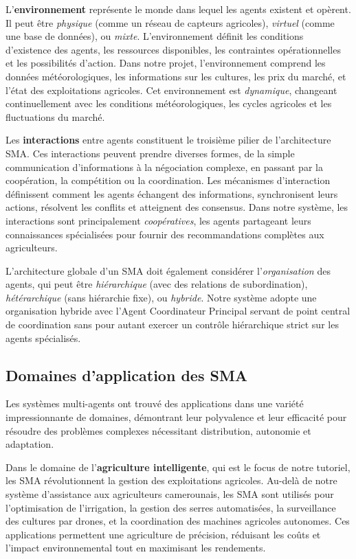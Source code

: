 L'\textbf{environnement} représente le monde dans lequel les agents existent et opèrent. Il peut être \emph{physique} (comme un réseau de capteurs agricoles), \emph{virtuel} (comme une base de données), ou \emph{mixte}. L'environnement définit les conditions d'existence des agents, les ressources disponibles, les contraintes opérationnelles et les possibilités d'action. Dans notre projet, l'environnement comprend les données météorologiques, les informations sur les cultures, les prix du marché, et l'état des exploitations agricoles. Cet environnement est \emph{dynamique}, changeant continuellement avec les conditions météorologiques, les cycles agricoles et les fluctuations du marché.

Les \textbf{interactions} entre agents constituent le troisième pilier de l'architecture SMA. Ces interactions peuvent prendre diverses formes, de la simple communication d'informations à la négociation complexe, en passant par la coopération, la compétition ou la coordination. Les mécanismes d'interaction définissent comment les agents échangent des informations, synchronisent leurs actions, résolvent les conflits et atteignent des consensus. Dans notre système, les interactions sont principalement \emph{coopératives}, les agents partageant leurs connaissances spécialisées pour fournir des recommandations complètes aux agriculteurs.

L'architecture globale d'un SMA doit également considérer l'\emph{organisation} des agents, qui peut être \emph{hiérarchique} (avec des relations de subordination), \emph{hétérarchique} (sans hiérarchie fixe), ou \emph{hybride}. Notre système adopte une organisation hybride avec l'Agent Coordinateur Principal servant de point central de coordination sans pour autant exercer un contrôle hiérarchique strict sur les agents spécialisés.

\subsection{Domaines d'application des SMA}

Les systèmes multi-agents ont trouvé des applications dans une variété impressionnante de domaines, démontrant leur polyvalence et leur efficacité pour résoudre des problèmes complexes nécessitant distribution, autonomie et adaptation.

Dans le domaine de l'\textbf{agriculture intelligente}, qui est le focus de notre tutoriel, les SMA révolutionnent la gestion des exploitations agricoles. Au-delà de notre système d'assistance aux agriculteurs camerounais, les SMA sont utilisés pour l'optimisation de l'irrigation, la gestion des serres automatisées, la surveillance des cultures par drones, et la coordination des machines agricoles autonomes. Ces applications permettent une agriculture de précision, réduisant les coûts et l'impact environnemental tout en maximisant les rendements.

